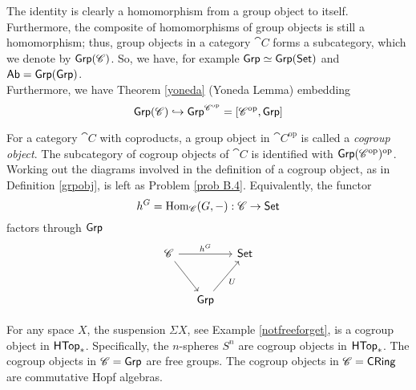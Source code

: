 \vspace*{0.1in}

\begin{discussion}
The identity is clearly a homomorphism from a group object to itself. Furthermore, the composite of homomorphisms of group objects is still a homomorphism; thus, group objects in a category $\cat{C}$ forms a subcategory, which we denote by $\mathsf{Grp}(\mathscr{C})$. So, we have, for example $\mathsf{Grp} \simeq \mathsf{Grp}(\mathsf{Set})$ and $\mathsf{Ab} = \mathsf{Grp}(\mathsf{Grp})$.\\[0.5em]
Furthermore, we have Theorem \ref{yoneda} (Yoneda Lemma) embedding
\[\mathsf{Grp}(\mathscr{C}) \hookrightarrow \mathsf{Grp}^{\mathscr{C}^{\text{op}}} = [\mathscr{C}^{\text{op}},\mathsf{Grp}]\]
\end{discussion}

\vspace*{0.1in}

\begin{definition}
For a category $\cat{C}$ with coproducts, a group object in $\cat{C}^{\text{op}}$ is called a \emph{cogroup object}. The subcategory of cogroup objects of $\cat{C}$ is identified with $\mathsf{Grp}(\mathscr{C}^{\text{op}})^{\text{op}}$. Working out the diagrams involved in the definition of a cogroup object, as in Definition \ref{grpobj}, is left as Problem \ref{prob B.4}. Equivalently, the functor
\[h^G = \mathrm{Hom}_{\mathscr{C}}(G,-):\mathscr{C} \to \mathsf{Set}\]
factors through $\mathsf{Grp}$
\[\begin{tikzcd}[row sep=large, column sep=small]
\cat{C} \arrow[rd] \arrow[rr, "h^G"] &                             & \ncat{Set} \\
                                              & \ncat{Grp} \arrow[ru, "U"'] &           
\end{tikzcd}\]
\end{definition}


\begin{example}
For any space $X$, the suspension $\Sigma X$, see Example \ref{notfreeforget}, is a cogroup object in $\mathsf{HTop}_*$. Specifically, the $n$-spheres $S^n$ are cogroup objects in $\mathsf{HTop}_*$. The cogroup objects in $\mathscr{C} = \mathsf{Grp}$ are free groups. The cogroup objects in $\mathscr{C} = \mathsf{CRing}$ are commutative Hopf algebras.
\end{example}

\vspace*{0.1in}

